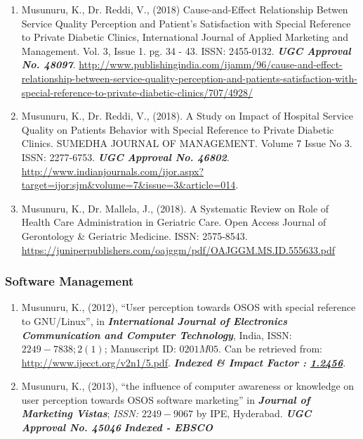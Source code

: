 \documentclass[10pt]{article}
\begin{document}
\begin{enumerate}
\item Musunuru, K., Dr. Reddi, V., (2018) Cause-and-Effect Relationship Betwen Service Quality Perception and Patient's Satisfaction with Special Reference to Private Diabetic Clinics, International Journal of Applied Marketing and Management. Vol. 3, Issue 1. pg. 34 - 43. ISSN: 2455-0132. \emph{\textbf{UGC Approval No. 48097}}. \url{http://www.publishingindia.com/ijamm/96/cause-and-effect-relationship-between-service-quality-perception-and-patients-satisfaction-with-special-reference-to-private-diabetic-clinics/707/4928/}

\item Musunuru, K., Dr. Reddi, V., (2018). A Study on Impact of Hospital Service Quality on Patients Behavior with Special Reference to Private Diabetic Clinics. SUMEDHA JOURNAL OF MANAGEMENT. Volume 7 Issue No 3. ISSN: 2277-6753. \emph{\textbf{UGC Approval No. 46802}}. \url{http://www.indianjournals.com/ijor.aspx?target=ijor:sjm&volume=7&issue=3&article=014}. 

\item Musunuru, K., Dr. Mallela, J., (2018). A Systematic Review on Role of Health Care 
Administration in Geriatric Care. Open Access Journal of Gerontology & Geriatric Medicine. ISSN: 2575-8543. \url{https://juniperpublishers.com/oajggm/pdf/OAJGGM.MS.ID.555633.pdf}

\end{enumerate}

\subsubsection{Software Management}

\begin{enumerate}
\item Musunuru, K., (2012), \enquote{User perception towards OSOS with special reference to GNU/Linux}, in \textit{\textbf{International  Journal  of  Electronics  Communication  and  Computer  Technology}},  India,  ISSN:$2249-7838; 2 (1)$; Manuscript ID: $0201M05$. Can be retrieved from: \url{http://www.ijecct.org/v2n1/5.pdf}. \emph{\textbf{Indexed \& Impact Factor : \href{http://www.ijecct.org/}{1.2456}}}. 

\item Musunuru, K., (2013), \enquote{the influence of computer awareness or knowledge on user perception towards OSOS software marketing} in \textit{\textbf{Journal of Marketing Vistas}}; \textit{ ISSN: $2249-9067$} by IPE, Hyderabad. \emph{\textbf{UGC Approval No. 45046 }}\emph{\textbf{Indexed - EBSCO}}\end{enumerate}
\end{document}
